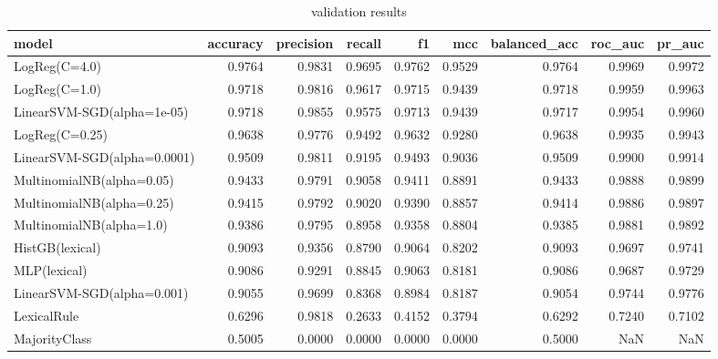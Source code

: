 \begin{table}[htbp]
\caption{validation results}
\label{tab:validation_results}
\begin{tabular}{lrrrrrrrr}
\toprule
model & accuracy & precision & recall & f1 & mcc & balanced_acc & roc_auc & pr_auc \\
\midrule
LogReg(C=4.0) & 0.9764 & 0.9831 & 0.9695 & 0.9762 & 0.9529 & 0.9764 & 0.9969 & 0.9972 \\
LogReg(C=1.0) & 0.9718 & 0.9816 & 0.9617 & 0.9715 & 0.9439 & 0.9718 & 0.9959 & 0.9963 \\
LinearSVM-SGD(alpha=1e-05) & 0.9718 & 0.9855 & 0.9575 & 0.9713 & 0.9439 & 0.9717 & 0.9954 & 0.9960 \\
LogReg(C=0.25) & 0.9638 & 0.9776 & 0.9492 & 0.9632 & 0.9280 & 0.9638 & 0.9935 & 0.9943 \\
LinearSVM-SGD(alpha=0.0001) & 0.9509 & 0.9811 & 0.9195 & 0.9493 & 0.9036 & 0.9509 & 0.9900 & 0.9914 \\
MultinomialNB(alpha=0.05) & 0.9433 & 0.9791 & 0.9058 & 0.9411 & 0.8891 & 0.9433 & 0.9888 & 0.9899 \\
MultinomialNB(alpha=0.25) & 0.9415 & 0.9792 & 0.9020 & 0.9390 & 0.8857 & 0.9414 & 0.9886 & 0.9897 \\
MultinomialNB(alpha=1.0) & 0.9386 & 0.9795 & 0.8958 & 0.9358 & 0.8804 & 0.9385 & 0.9881 & 0.9892 \\
HistGB(lexical) & 0.9093 & 0.9356 & 0.8790 & 0.9064 & 0.8202 & 0.9093 & 0.9697 & 0.9741 \\
MLP(lexical) & 0.9086 & 0.9291 & 0.8845 & 0.9063 & 0.8181 & 0.9086 & 0.9687 & 0.9729 \\
LinearSVM-SGD(alpha=0.001) & 0.9055 & 0.9699 & 0.8368 & 0.8984 & 0.8187 & 0.9054 & 0.9744 & 0.9776 \\
LexicalRule & 0.6296 & 0.9818 & 0.2633 & 0.4152 & 0.3794 & 0.6292 & 0.7240 & 0.7102 \\
MajorityClass & 0.5005 & 0.0000 & 0.0000 & 0.0000 & 0.0000 & 0.5000 & NaN & NaN \\
\bottomrule
\end{tabular}
\end{table}
